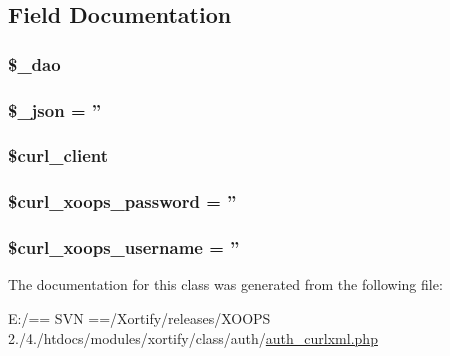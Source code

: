 \subsection{Field Documentation}
\hypertarget{class_xortify_auth_curlxml_a12a029c610f699b4b25e79a1f64a3485}{
\subsubsection[{\$\-\_\-dao}]{\setlength{\rightskip}{0pt plus 5cm}\$\-\_\-dao}}\label{class_xortify_auth_curlxml_a12a029c610f699b4b25e79a1f64a3485}
\hypertarget{class_xortify_auth_curlxml_a94787b37d92a2dee02534eed4f316589}{
\subsubsection[{\$\-\_\-json}]{\setlength{\rightskip}{0pt plus 5cm}\$\-\_\-json = ''}}\label{class_xortify_auth_curlxml_a94787b37d92a2dee02534eed4f316589}
\hypertarget{class_xortify_auth_curlxml_a402f2112991f3227835af80e9df33e38}{
\subsubsection[{\$curl\-\_\-client}]{\setlength{\rightskip}{0pt plus 5cm}\$curl\-\_\-client}}\label{class_xortify_auth_curlxml_a402f2112991f3227835af80e9df33e38}
\hypertarget{class_xortify_auth_curlxml_a6c9851541ed3826c67cfe7224c38f0b8}{
\subsubsection[{\$curl\-\_\-xoops\-\_\-password}]{\setlength{\rightskip}{0pt plus 5cm}\$curl\-\_\-xoops\-\_\-password = ''}}\label{class_xortify_auth_curlxml_a6c9851541ed3826c67cfe7224c38f0b8}
\hypertarget{class_xortify_auth_curlxml_aab7480ba9f878a02b2c9fd43922fa070}{
\subsubsection[{\$curl\-\_\-xoops\-\_\-username}]{\setlength{\rightskip}{0pt plus 5cm}\$curl\-\_\-xoops\-\_\-username = ''}}\label{class_xortify_auth_curlxml_aab7480ba9f878a02b2c9fd43922fa070}


The documentation for this class was generated from the following file\-:\begin{DoxyCompactItemize}
\item 
E\-:/== S\-V\-N ==/\-Xortify/releases/\-X\-O\-O\-P\-S 2./4./htdocs/modules/xortify/class/auth/\hyperlink{auth__curlxml_8php}{auth\-\_\-curlxml.\-php}\end{DoxyCompactItemize}
